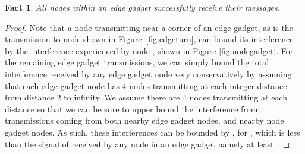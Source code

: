 \documentclass{article}
\newtheorem{fact}[lemma]{Fact}
\begin{document}
\begin{fact}
All nodes within an edge gadget successfully receive their messages.
\end{fact}
\begin{proof}
Note that a node transmitting near a corner of an edge gadget, as is the transmission to node  shown in Figure~\ref{fig:edgeturn}, can bound its interference by the interference experienced by node , shown in Figure \ref{fig:nodegadget}.  For the remaining edge gadget transmissions, we can simply bound the total interference received by any edge gadget node very conservatively by assuming that each edge gadget node has 4 nodes transmitting at each integer distance from distance 2 to infinity.  We assume there are 4 nodes transmitting at each distance so that we can be sure to upper bound the interference from transmissions coming from both nearby edge gadget nodes, and nearby node gadget nodes.  As such, these interferences can be bounded by , for , which is less than the signal of received by any node in an edge gadget namely at least .
\end{proof}
\end{document}
